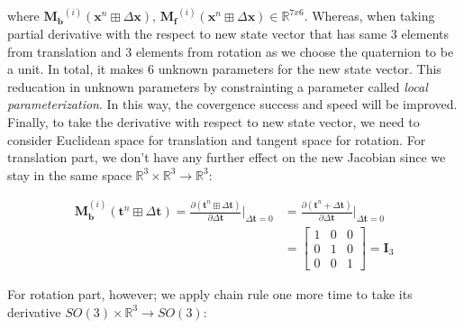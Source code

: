 \documentclass[a4paper]{report}
\numberwithin{figure}{section}
\newcommand{\R}{\mathbb{R}}
\begin{document}
\begin{appendices}
where $\mathbf{M_b}^{(i)}(\mathbf{x}^n\boxplus \Delta \mathbf{x}) \text{, } 
\mathbf{M_f}^{(i)}(\mathbf{x}^n\boxplus \Delta \mathbf{x}) \in \R^{7x6}$.
Whereas, when taking partial derivative with the respect to 
new state vector that has same 3 elements from translation and 3 elements from 
rotation as we choose the quaternion to be a unit.
In total, it makes 6 unknown parameters for the new state vector. 
This reducation in unknown parameters by constrainting a parameter 
called \textit{local parameterization}. In this way, the covergence success and 
speed will be improved. 
Finally, to take the derivative with respect to new state vector, we need to consider 
Euclidean space for translation and tangent space for rotation. For translation part, 
we don't have any further effect on the new Jacobian since we stay in the same space 
$\R^3 \times \R^3 \rightarrow \R^3$:

\begin{equation}
  \begin{aligned}
  \mathbf{M}^{(i)}_{\mathbf{b}}(\mathbf{t}^n \boxplus \Delta \mathbf{t}) = 
    \frac{\partial (\mathbf{t}^{n} \boxplus \Delta \mathbf{t})}{\partial \Delta \mathbf{t}} 
    \bigg|_{\Delta \mathbf{t} = 0} & =
  \frac{\partial (\mathbf{t}^{n} + \Delta \mathbf{t})}{\partial \Delta \mathbf{t}}
    \bigg|_{\Delta \mathbf{t} = 0} \\
    & =
      \begin{bmatrix} 
        1 & 0 & 0 \\  
        0 & 1 & 0 \\  
        0 & 0 & 1
      \end{bmatrix} = \mathbf{I}_3
  \end{aligned}
\end{equation}

For rotation part, however; we apply chain rule one more time to take its derivative 
$SO(3) \times \R^3 \rightarrow SO(3)$:


\end{appendices}
\end{document}
